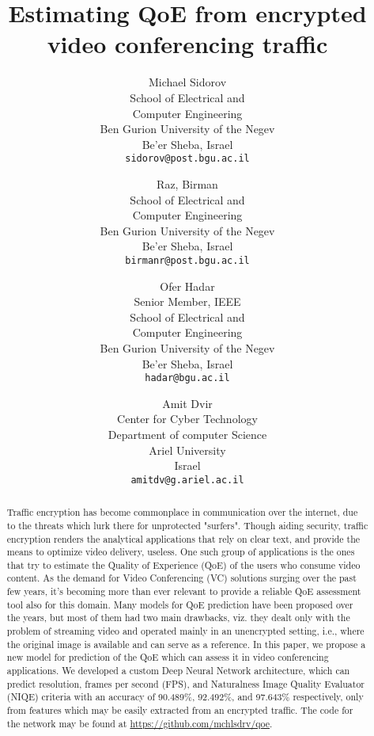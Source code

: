 \documentclass[english, twocolumn]{article}
\title{Estimating QoE from encrypted video conferencing traffic}
\author{
    Michael Sidorov\\
    School of Electrical and\\Computer Engineering\\Ben Gurion University of the Negev\\Be'er Sheba, Israel\\
    \texttt{sidorov@post.bgu.ac.il}
    \and
    Raz, Birman\\
    School of Electrical and\\Computer Engineering\\Ben Gurion University of the Negev\\Be'er Sheba, Israel\\
    \texttt{birmanr@post.bgu.ac.il}
    \and
    Ofer Hadar\\
    Senior Member, IEEE\\School of Electrical and\\Computer Engineering\\Ben Gurion University of the Negev\\Be'er Sheba, Israel\\
    \texttt{hadar@bgu.ac.il}
    \and
    Amit Dvir\\
    Center for Cyber Technology\\Department of computer Science\\Ariel University\\Israel\\
    \texttt{amitdv@g.ariel.ac.il}
}
\begin{document}
\maketitle
\begin{abstract}
Traffic encryption has become commonplace in communication over the internet, due to the threats which lurk there for unprotected "surfers". 
Though aiding security, traffic encryption renders the analytical applications that rely on clear text, and provide the means to optimize video delivery, useless. 
One such group of applications is the ones that try to estimate the Quality of Experience (QoE) of the users who consume video content. 
As the demand for Video Conferencing (VC) solutions surging over the past few years,
it's becoming more than ever relevant to provide a reliable QoE assessment tool also for this domain.
Many models for QoE prediction have been proposed over the years, but most of them had two main drawbacks, viz. they dealt only with the problem of streaming video and operated mainly in an unencrypted setting, i.e., where the original image is available and can serve as a reference.
In this paper, we propose a new model for prediction of the QoE which can assess it in video conferencing applications. We developed a custom Deep Neural Network architecture, which can predict resolution, frames per second (FPS), and Naturalness Image Quality Evaluator (NIQE) criteria with an accuracy of 90.489\%, 92.492\%, and 97.643\% respectively, only from features which may be easily extracted from an encrypted traffic. The code for the network may be found at \url{https://github.com/mchlsdrv/qoe}.



\end{abstract}
\end{document}
